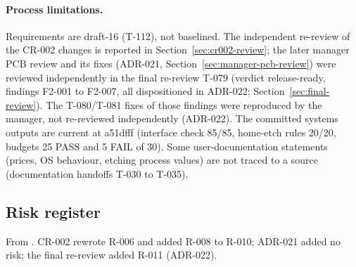 \paragraph{Process limitations.} Requirements are draft-16 (T-112), not baselined.
The independent re-review of the CR-002 changes is reported in
Section~\ref{sec:cr002-review}; the later manager PCB review and its fixes
(ADR-021, Section~\ref{sec:manager-pcb-review}) were reviewed independently in the
final re-review T-079 (verdict release-ready, findings F2-001 to F2-007, all
dispositioned in ADR-022; Section~\ref{sec:final-review}). The T-080/T-081 fixes of
those findings were reproduced by the manager, not re-reviewed independently
(ADR-022). The committed systems outputs are current at a51dfff (interface check
85/85, home-etch rules 20/20, budgets 25 PASS and 5 FAIL of 30). Some
user-documentation statements (prices, OS behaviour, etching process values) are
not traced to a source (documentation handoffs T-030 to T-035).

\subsection{Risk register}
\label{sec:risks}
From . CR-002 rewrote R-006 and added R-008 to R-010;
ADR-021 added no risk; the final re-review added R-011 (ADR-022).

